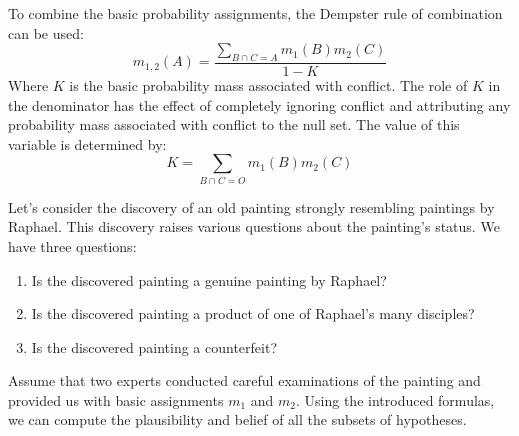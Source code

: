 To combine the basic probability assignments, the Dempster rule of combination can be used:
\[m_{1,2}(A)=\dfrac{\sum_{B \cap C=A}m_1(B)m_2(C)}{1-K}\]
Where $K$ is the basic probability mass associated with conflict. 
The role of $K$ in the denominator has the effect of completely ignoring conflict and attributing any probability mass associated with conflict to the null set. 
The value of this variable is determined by:
\[K=\sum_{B \cap C=O}m_1(B)m_2(C)\]
\begin{example}
    Let's consider the discovery of an old painting strongly resembling paintings by Raphael. 
    This discovery raises various questions about the painting's status. 
    We have three questions:
    \begin{enumerate}
        \item Is the discovered painting a genuine painting by Raphael?
        \item Is the discovered painting a product of one of Raphael's many disciples?
        \item Is the discovered painting a counterfeit?
    \end{enumerate}
    Assume that two experts conducted careful examinations of the painting and provided us with basic assignments $m_1$ and $m_2$. 
    Using the introduced formulas, we can compute the plausibility and belief of all the subsets of hypotheses.
\end{example}